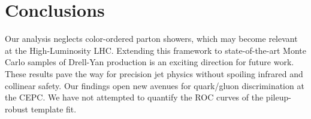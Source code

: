 \section{Conclusions}\label{sec:conclusions}

Our analysis neglects color-ordered parton showers, which may become
relevant at the High-Luminosity LHC. Extending this framework to
state-of-the-art Monte Carlo samples of Drell-Yan production is an
exciting direction for future work. These results pave the way for
precision jet physics without spoiling infrared and collinear safety.
Our findings open new avenues for quark/gluon discrimination at the
CEPC. We have not attempted to quantify the ROC curves of the
pileup-robust template fit.

